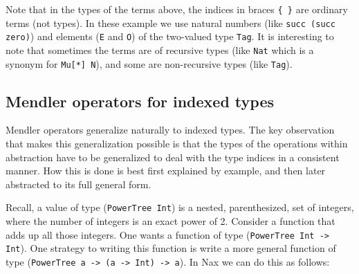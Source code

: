 Note that in the types of the terms above, the 
indices in braces \verb+{ }+ are ordinary terms (not types). In these example we use 
natural numbers (like \verb+succ (succ zero)+) and elements (\verb+E+ and \verb+O+)
of the two-valued type \verb+Tag+. It is interesting to note that sometimes the
terms are of recursive types (like \verb+Nat+ which is a synonym for \verb+Mu[*] N+),
and some are non-recursive types (like \verb+Tag+).


\subsection{Mendler operators for indexed types}

Mendler operators generalize naturally to indexed types. The key observation
that makes this generalization possible is that the types of the operations
within abstraction have to be generalized to deal with the type indices in
a consistent manner. How this is done is best first explained by example, and
then later abstracted to its full general form.

Recall, a value of type (\verb+PowerTree Int+) is a nested, parenthesized, set
of integers, where the number of integers is an exact power of 2. Consider
a function that adds up all those integers. One wants a function of type
(\verb+PowerTree Int -> Int+). One strategy to writing this function is write
a more general function of type (\verb+PowerTree a -> (a -> Int) -> a+). In
Nax we can do this as follows:

